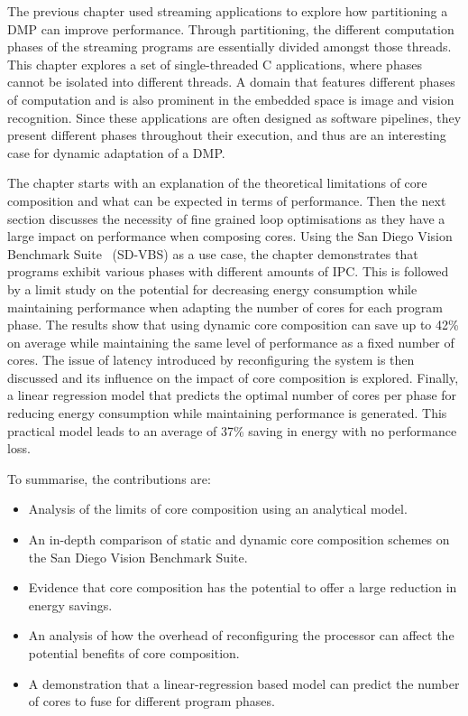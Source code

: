 The previous chapter used streaming applications to explore how partitioning a DMP can improve performance.
Through partitioning, the different computation phases of the streaming programs are essentially divided amongst those threads.
This chapter explores a set of single-threaded C applications, where phases cannot be isolated into different threads.
A domain that features different phases of computation and is also prominent in the embedded space is image and vision recognition.
Since these applications are often designed as software pipelines, they present different phases throughout their execution, and thus are an interesting case for dynamic adaptation of a DMP.

The chapter starts with an explanation of the theoretical limitations of core composition and what can be expected in terms of performance.
Then the next section discusses the necessity of fine grained loop optimisations as they have a large impact on performance when composing cores.
Using the San Diego Vision Benchmark Suite~\cite{sdvbs} (SD-VBS) as a use case, the chapter demonstrates that programs exhibit various phases with different amounts of IPC.
This is followed by a limit study on the potential for decreasing energy consumption while maintaining performance when adapting the number of cores for each program phase.
The results show that using dynamic core composition can save up to 42\% on average while maintaining the same level of performance as a fixed number of cores.
The issue of latency introduced by reconfiguring the system is then discussed and its influence on the impact of core composition is explored.
Finally, a linear regression model that predicts the optimal number of cores per phase for reducing energy consumption while maintaining performance is generated.
This practical model leads to an average of 37\% saving in energy with no performance loss.

To summarise, the contributions are:
\vspace{-1em}
\begin{itemize}
\item Analysis of the limits of core composition using an analytical model.
\vspace{-1em}
\item An in-depth comparison of static and dynamic core composition schemes on the San Diego Vision Benchmark Suite.
\vspace{-1em}
\item Evidence that core composition has the potential to offer a large reduction in energy savings.
\vspace{-1em}
\item An analysis of how the overhead of reconfiguring the processor can affect the potential benefits of core composition.
\vspace{-1em}
\item A demonstration that a linear-regression based model can predict the number of cores to fuse for different program phases.
\end{itemize}

